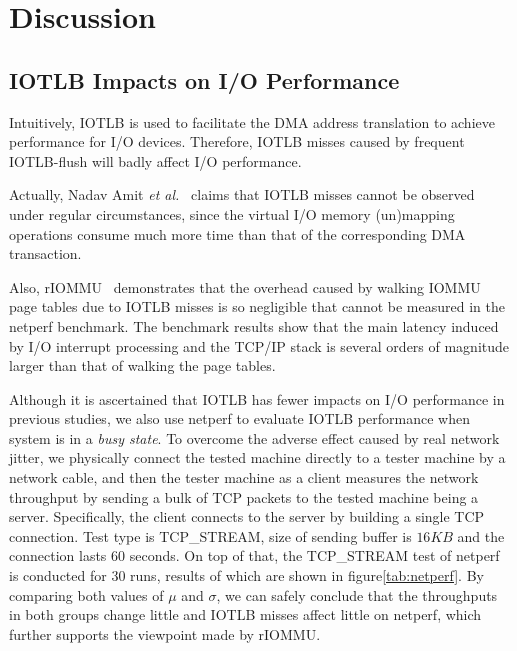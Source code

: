 \section{Discussion} \label{sec:dis}
\subsection{IOTLB Impacts on I/O Performance}

Intuitively, IOTLB is used to facilitate the DMA address translation to achieve performance for I/O devices. Therefore, IOTLB misses caused by frequent IOTLB-flush will badly affect I/O performance.

Actually, Nadav Amit \emph{et al.}~\cite{amit2012iommu} claims that IOTLB misses cannot be observed under regular circumstances, since the virtual I/O memory (un)mapping operations consume much more time than that of the corresponding DMA transaction. 

Also, rIOMMU~\cite{malka2015riommu} demonstrates that the overhead caused by walking IOMMU page tables due to IOTLB misses is so negligible that cannot be measured in the netperf benchmark. The benchmark results show that the main latency induced by I/O interrupt processing and the TCP/IP stack is several orders of magnitude larger than that of walking the page tables.

Although it is ascertained that IOTLB has fewer impacts on I/O performance in previous studies, we also use netperf to evaluate IOTLB performance when system is in a \emph{busy state}. To overcome the adverse effect caused by real network jitter, we physically connect the tested machine directly to a tester machine by a network cable, and then the tester machine as a client measures the network throughput by sending a bulk of TCP packets to the tested machine being a server.
Specifically, the client connects to the server by building a single TCP connection. Test type is TCP\_STREAM, size of sending buffer is $16KB$ and the connection lasts $60$ seconds. On top of that, the TCP\_STREAM test of netperf is conducted for $30$ runs, results of which are shown in figure\ref{tab:netperf}. By comparing both values of $\mu$ and $\sigma$, we can safely conclude that the throughputs in both groups change little and IOTLB misses affect little on netperf, which further supports the viewpoint made by rIOMMU. 


